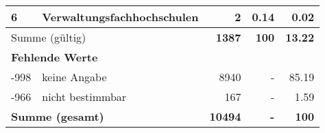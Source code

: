 \begin{longtable}{lXrrr}
     6 &
     \multicolumn{1}{X}{ Verwaltungsfachhochschulen   } &


       \num{2} &
       \num[round-mode=places,round-precision=2]{0,14} &
         \num[round-mode=places,round-precision=2]{0,02} \\
     \midrule
     \multicolumn{2}{l}{Summe (gültig)} &
       \textbf{\num{1387}} &
     \textbf{100} &
       \textbf{\num[round-mode=places,round-precision=2]{13,22}} \\
     \multicolumn{5}{l}{\textbf{Fehlende Werte}}\\
       -998 &
       keine Angabe &
         \num{8940} &
        - &
         \num[round-mode=places,round-precision=2]{85,19} \\
       -966 &
       nicht bestimmbar &
         \num{167} &
        - &
         \num[round-mode=places,round-precision=2]{1,59} \\
     \midrule
     \multicolumn{2}{l}{\textbf{Summe (gesamt)}} &
          \textbf{\num{10494}} &
        \textbf{-} &
        \textbf{100} \\
     \bottomrule
     \end{longtable}
     
